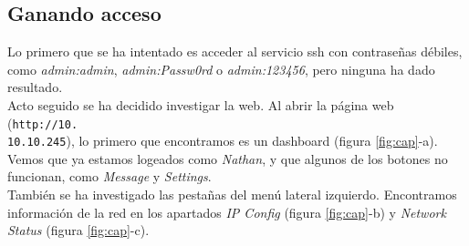 \subsection{Ganando acceso}

Lo primero que se ha intentado es acceder al servicio \acrshort{ssh} con contraseñas débiles, como \textit{admin:admin}, \textit{admin:Passw0rd} o \textit{admin:123456}, pero ninguna ha dado resultado.\\

Acto seguido se ha decidido investigar la web. Al abrir la página web (\texttt{http://10.\\10.10.245}), lo primero que encontramos es un dashboard (figura \ref{fig:cap}-a). Vemos que ya estamos logeados como \textit{Nathan}, y que algunos de los botones no funcionan, como \textit{Message} y \textit{Settings}.\\

También se ha investigado las pestañas del menú lateral izquierdo. Encontramos información de la red en los apartados \textit{IP Config} (figura \ref{fig:cap}-b) y \textit{Network Status} (figura \ref{fig:cap}-c).\\

